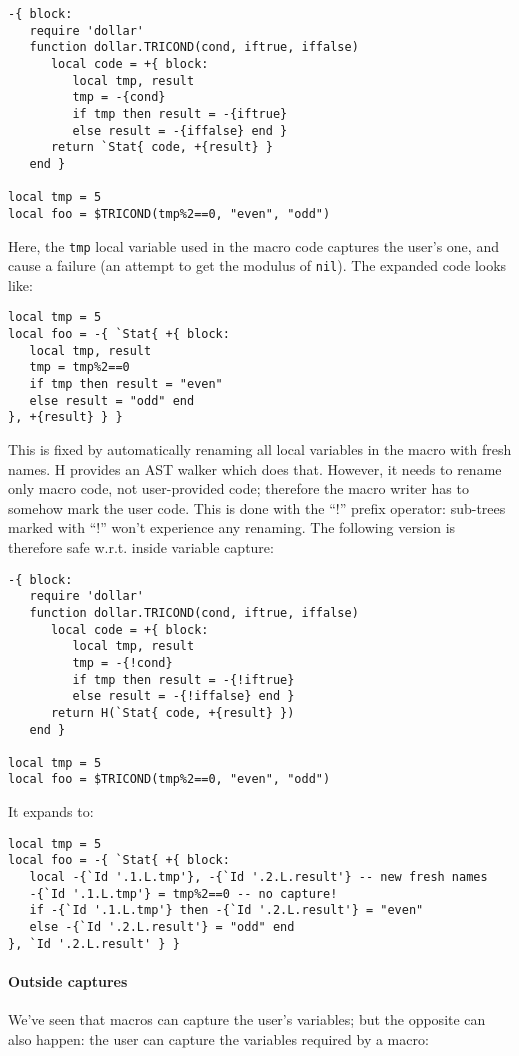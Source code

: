 \begin{verbatim}
-{ block:
   require 'dollar'
   function dollar.TRICOND(cond, iftrue, iffalse)
      local code = +{ block:
         local tmp, result
         tmp = -{cond}
         if tmp then result = -{iftrue} 
         else result = -{iffalse} end }
      return `Stat{ code, +{result} }
   end }

local tmp = 5
local foo = $TRICOND(tmp%2==0, "even", "odd")
\end{verbatim}

Here, the \verb|tmp| local variable used in the macro code captures
the user's one, and cause a failure (an attempt to get the modulus of
\verb|nil|). The expanded code looks like:
\begin{Verbatim}
local tmp = 5
local foo = -{ `Stat{ +{ block:
   local tmp, result
   tmp = tmp%2==0
   if tmp then result = "even"
   else result = "odd" end
}, +{result} } }
\end{Verbatim}

This is fixed by automatically renaming all local variables in the
macro with fresh names. H provides an AST walker which does
that. However, it needs to rename only macro code, not user-provided
code; therefore the macro writer has to somehow mark the user
code. This is done with the ``!'' prefix operator: sub-trees marked
with ``!'' won't experience any renaming. The following version is
therefore safe w.r.t. inside variable capture:

\begin{verbatim}
-{ block:
   require 'dollar'
   function dollar.TRICOND(cond, iftrue, iffalse)
      local code = +{ block:
         local tmp, result
         tmp = -{!cond}
         if tmp then result = -{!iftrue} 
         else result = -{!iffalse} end }
      return H(`Stat{ code, +{result} })
   end }

local tmp = 5
local foo = $TRICOND(tmp%2==0, "even", "odd")
\end{verbatim}

It expands to:

\begin{Verbatim}
local tmp = 5
local foo = -{ `Stat{ +{ block:
   local -{`Id '.1.L.tmp'}, -{`Id '.2.L.result'} -- new fresh names
   -{`Id '.1.L.tmp'} = tmp%2==0 -- no capture!
   if -{`Id '.1.L.tmp'} then -{`Id '.2.L.result'} = "even"
   else -{`Id '.2.L.result'} = "odd" end
}, `Id '.2.L.result' } }
\end{Verbatim}

\paragraph{Outside captures}
We've seen that macros can capture the user's variables; but the
opposite can also happen: the user can capture the variables required
by a macro:

